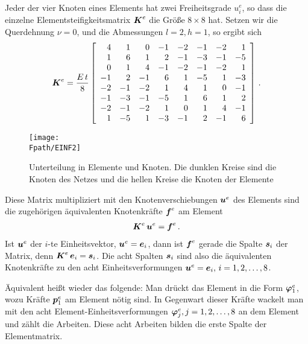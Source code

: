 Jeder der vier Knoten eines Elements hat zwei Freiheitsgrade $u_i^e$, so dass die einzelne Elementsteifigkeitsmatrix $\mbox{\boldmath $K$}^e$ die Gr\"{o}{\ss}e $8 \times 8$ hat. Setzen wir die Querdehnung $\nu = 0$, und die Abmessungen $l = 2, h = 1$, so ergibt sich
\begin{equation}
\mbox{\boldmath $K$}^e = \frac{E\,t}{8}\left[
\begin{array}{r r r r r r r r}
4 & 1 & 0 & -1 & -2 & -1 & -2 & 1\\
1 & 6 & 1 & 2 & -1 & -3 & -1 & -5\\
0 & 1 & 4 & -1 & -2 & -1 & -2 & 1\\
-1 & 2 & -1 & 6 & 1 & -5 & 1 & -3\\
-2 & -1 & -2 & 1 & 4 & 1 & 0 & -1\\
-1 & -3 & -1 & -5 & 1 & 6 & 1 & 2\\
-2 & -1 & -2 & 1 & 0 & 1 & 4 & -1\\
1 & -5 & 1 & -3 & -1 & 2 & -1 & 6\\
\end{array}
\right]\,.
\end{equation}
\begin{figure}[tbp] \centering
\if {} \sidecaption \fi
\texttt{[image: \\Fpath/EINF2]}
\caption{Unterteilung in Elemente und Knoten. Die dunklen Kreise sind die Knoten des
Netzes und die hellen Kreise die Knoten der Elemente} \label{Einf2}
\end{figure}%
Diese Matrix multipliziert mit den Knotenverschiebungen $\mbox{\boldmath $u$}^e$ des Elements sind die zugeh\"{o}rigen \"{a}quivalenten Knotenkr\"{a}fte $\mbox{\boldmath $f$}^e$ am Element
\begin{align}
\mbox{\boldmath $K$}^e \,\mbox{\boldmath $u$}^e = \mbox{\boldmath $f$}^e\,.
\end{align}
Ist $\mbox{\boldmath $u$}^e$ der $i$-te Einheitsvektor, $\mbox{\boldmath $u$}^e = \mbox{\boldmath $e$}_i$, dann ist $\mbox{\boldmath $f$}^e$ gerade die Spalte $\mbox{\boldmath $s$}_i$ der Matrix, denn $\mbox{\boldmath $K$}^e\,\mbox{\boldmath $e$}_i = \mbox{\boldmath $s$}_i$. Die acht Spalten $\mbox{\boldmath $s$}_i$ sind also die \"{a}quivalenten Knotenkr\"{a}fte zu den acht Einheitsverformungen $\mbox{\boldmath $u$}^e = \mbox{\boldmath $e$}_i, \,i = 1,2,\ldots,8$.

\"{A}quivalent hei{\ss}t wieder das folgende: Man dr\"{u}ckt das Element in die Form $\mbox{\boldmath $\varphi$}_1^e$, wozu Kr\"{a}fte $\mbox{\boldmath $p$}_1^e$ am Element n\"{o}tig sind. In Gegenwart dieser Kr\"{a}fte wackelt man mit den acht Element-Einheitsverformungen $\mbox{\boldmath $\varphi$}_j^e, j = 1, 2, \ldots, 8$ an dem Element und z\"{a}hlt die Arbeiten. Diese acht Arbeiten bilden die erste Spalte der Elementmatrix.

